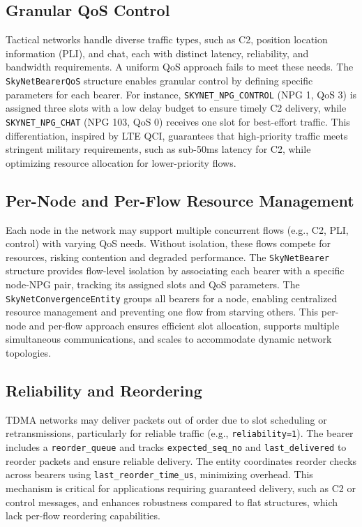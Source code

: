 \documentclass{article}
\begin{document}
\subsection{Granular QoS Control}
Tactical networks handle diverse traffic types, such as C2, position location information (PLI), and
chat, each with distinct latency, reliability, and bandwidth requirements. A uniform QoS approach
fails to meet these needs. The \texttt{SkyNetBearerQoS} structure enables granular control by
defining specific parameters for each bearer. For instance, \texttt{SKYNET\_NPG\_CONTROL} (NPG 1,
QoS 3) is assigned three slots with a low delay budget to ensure timely C2 delivery, while
\texttt{SKYNET\_NPG\_CHAT} (NPG 103, QoS 0) receives one slot for best-effort traffic. This
differentiation, inspired by LTE QCI, guarantees that high-priority traffic meets stringent military
requirements, such as sub-50ms latency for C2, while optimizing resource allocation for
lower-priority flows.

\subsection{Per-Node and Per-Flow Resource Management}
Each node in the network may support multiple concurrent flows (e.g., C2, PLI, control) with varying
QoS needs. Without isolation, these flows compete for resources, risking contention and degraded
performance. The \texttt{SkyNetBearer} structure provides flow-level isolation by associating each
bearer with a specific node-NPG pair, tracking its assigned slots and QoS parameters. The
\texttt{SkyNetConvergenceEntity} groups all bearers for a node, enabling centralized resource
management and preventing one flow from starving others. This per-node and per-flow approach ensures
efficient slot allocation, supports multiple simultaneous communications, and scales to accommodate
dynamic network topologies.

\subsection{Reliability and Reordering}
TDMA networks may deliver packets out of order due to slot scheduling or retransmissions,
particularly for reliable traffic (e.g., \texttt{reliability=1}). The bearer includes
a \texttt{reorder\_queue} and tracks \texttt{expected\_seq\_no} and \texttt{last\_delivered} to
reorder packets and ensure reliable delivery. The entity coordinates
reorder checks across bearers using \texttt{last\_reorder\_time\_us}, minimizing overhead. This
mechanism is critical for applications requiring guaranteed delivery, such as C2 or control
messages, and enhances robustness compared to flat structures, which lack per-flow reordering
capabilities.
\end{document}
